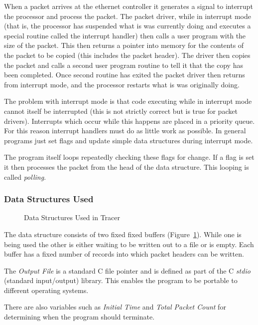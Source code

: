 When a packet arrives at the ethernet controller it generates a signal
to interrupt the processor and process the packet.  The packet driver,
while in interrupt mode (that is, the processor has suspended what is
was currently doing and executes a special routine called the
interrupt handler) then calls a user program with the size of the
packet.  This then returns a pointer into memory for the contents of
the packet to be copied (this includes the packet header).  The driver
then copies the packet and calls a second user program routine to tell
it that the copy has been completed.  Once second routine has exited
the packet driver then returns from interrupt mode, and the processor
restarts what is was originally doing.

The problem with interrupt mode is that code executing while in
interrupt mode cannot itself be interrupted (this is not strictly
correct but is true for packet drivers).  Interrupts which occur while
this happens are placed in a priority queue.  For this reason
interrupt handlers must do as little work as possible.  In general
programs just set flags and update simple data structures during
interrupt mode.

The program itself loops repeatedly checking these flags for change.
If a flag is set it then processes the packet from the head of the
data structure.  This looping is called {\em polling}.

\subsubsection{Data Structures Used}

\begin{figure}
\leavevmode
{}
\caption{Data Structures Used in Tracer}
\label{trace:structures}
\end{figure}

The data structure consists of two fixed fixed buffers
(Figure~\ref{trace:structures}).  While one is being used the other is
either waiting to be written out to a file or is empty.  Each buffer
has a fixed number of records into which packet headers can be
written.

The {\em Output File} is a standard C file pointer and is defined as
part of the C {\em stdio} (standard input/output) library.  This
enables the program to be portable to different operating systems.

There are also variables such as {\em Initial Time} and {\em Total
Packet Count} for determining when the program should terminate.

